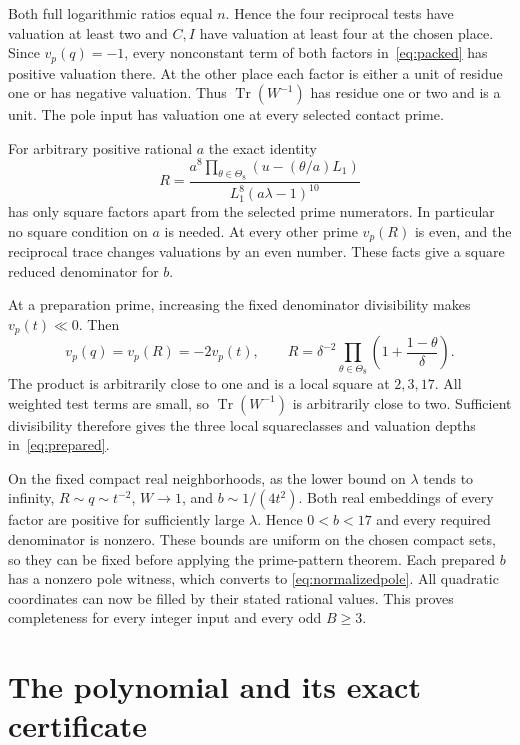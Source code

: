 \documentclass[11pt,a4paper]{article}
\DeclareMathOperator{\Tr}{Tr}\DeclareMathOperator{\Nm}{N}
\begin{document}
Both full logarithmic ratios equal $n$. Hence the four reciprocal
tests have valuation at least two and $C,I$ have valuation at least
four at the chosen place. Since $v_p(q)=-1$, every nonconstant term
of both factors in~\eqref{eq:packed} has positive valuation there.
At the other place each factor is either a unit of residue one or has
negative valuation. Thus $\Tr(W^{-1})$ has residue one or two and is
a unit. The pole input has valuation one at every selected contact prime.

For arbitrary positive rational $a$ the exact identity
\begin{equation}\label{eq:primeproduct}
 R=\frac{a^8\prod_{\theta\in\Theta_8}(u-(\theta/a)L_1)}
             {L_1^8(a\lambda-1)^{10}}
\end{equation}
has only square factors apart from the selected prime numerators.
In particular no square condition on $a$ is needed. At every other
prime $v_p(R)$ is even, and the reciprocal trace changes valuations
by an even number. These facts give a square reduced denominator for $b$.

At a preparation prime, increasing the fixed denominator divisibility
makes $v_p(t)\ll0$. Then
\[
 v_p(q)=v_p(R)=-2v_p(t),\qquad
 R=\delta^{-2}\prod_{\theta\in\Theta_8}
                   \left(1+\frac{1-\theta}{\delta}\right).
\]
The product is arbitrarily close to one and is a local square at
$2,3,17$. All weighted test terms are small, so $\Tr(W^{-1})$ is
arbitrarily close to two. Sufficient divisibility therefore gives the
three local squareclasses and valuation depths in~\eqref{eq:prepared}.

On the fixed compact real neighborhoods, as the lower bound on $\lambda$
tends to infinity, $R\sim q\sim t^{-2}$, $W\to1$, and
$b\sim1/(4t^2)$. Both real embeddings of every factor are positive
for sufficiently large $\lambda$. Hence $0<b<17$ and every required
denominator is nonzero. These bounds are uniform on the chosen compact
sets, so they can be fixed before applying the prime-pattern theorem.
Each prepared $b$ has a nonzero pole witness, which converts to
\eqref{eq:normalizedpole}. All quadratic coordinates can now be filled
by their stated rational values. This proves completeness for every
integer input and every odd $B\ge3$.

\section{The polynomial and its exact certificate}
\end{document}
